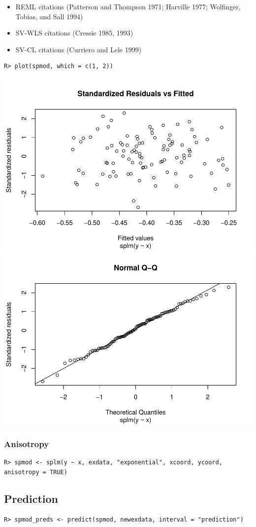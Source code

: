 \documentclass{article}
\providecommand{\tightlist}{%
  \setlength{\itemsep}{0pt}\setlength{\parskip}{0pt}}
\begin{document}
\begin{itemize}
\tightlist
\item
  REML citations (Patterson and Thompson 1971; Harville 1977; Wolfinger,
  Tobias, and Sall 1994)
\item
  SV-WLS citations (Cressie 1985, 1993)
\item
  SV-CL citations (Curriero and Lele 1999)
\end{itemize}

\begin{verbatim}
R> plot(spmod, which = c(1, 2))
\end{verbatim}

\includegraphics[width=0.49\linewidth]{preprint_files/figure-latex/unnamed-chunk-2-1}
\includegraphics[width=0.49\linewidth]{preprint_files/figure-latex/unnamed-chunk-2-2}

\hypertarget{anisotropy}{%
\subsubsection{Anisotropy}\label{anisotropy}}

\begin{verbatim}
R> spmod <- splm(y ~ x, exdata, "exponential", xcoord, ycoord, anisotropy = TRUE)
\end{verbatim}

\hypertarget{prediction}{%
\subsection{Prediction}\label{prediction}}

\begin{verbatim}
R> spmod_preds <- predict(spmod, newexdata, interval = "prediction")
\end{verbatim}
\end{document}
